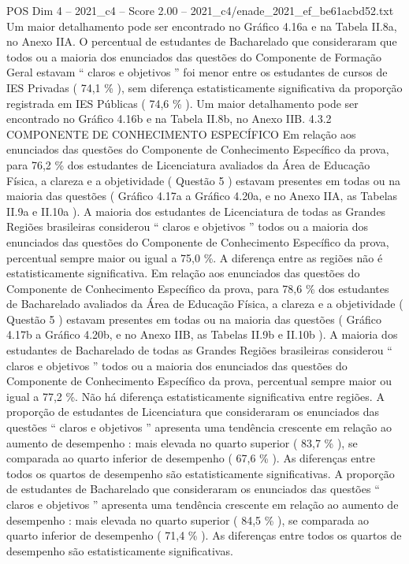 \begin{textsample}{POS Dim 4 – 2021\_c4 – Score 2.00 – 2021\_c4/enade\_2021\_ef\_be61acbd52.txt}
Um maior detalhamento pode ser encontrado no Gráfico 4.16a e na Tabela II.8a, no Anexo IIA.
O percentual de estudantes de Bacharelado que consideraram que todos ou a maioria dos enunciados das questões do Componente de Formação Geral estavam “ claros e objetivos ” foi menor entre os estudantes de cursos de IES Privadas ( 74,1 \% ), sem diferença estatisticamente significativa da proporção registrada em IES Públicas ( 74,6 \% ).
Um maior detalhamento pode ser encontrado no Gráfico 4.16b e na Tabela II.8b, no Anexo IIB. 4.3.2 COMPONENTE DE CONHECIMENTO ESPECÍFICO Em relação aos enunciados das questões do Componente de Conhecimento Específico da prova, para 76,2 \% dos estudantes de Licenciatura avaliados da Área de Educação Física, a clareza e a objetividade ( Questão 5 ) estavam presentes em todas ou na maioria das questões ( Gráfico 4.17a a Gráfico 4.20a, e no Anexo IIA, as Tabelas II.9a e II.10a ).
A maioria dos estudantes de Licenciatura de todas as Grandes Regiões brasileiras considerou “ claros e objetivos ” todos ou a maioria dos enunciados das questões do Componente de Conhecimento Específico da prova, percentual sempre maior ou igual a 75,0 \%.
A diferença entre as regiões não é estatisticamente significativa.
Em relação aos enunciados das questões do Componente de Conhecimento Específico da prova, para 78,6 \% dos estudantes de Bacharelado avaliados da Área de Educação Física, a clareza e a objetividade ( Questão 5 ) estavam presentes em todas ou na maioria das questões ( Gráfico 4.17b a Gráfico 4.20b, e no Anexo IIB, as Tabelas II.9b e II.10b ).
A maioria dos estudantes de Bacharelado de todas as Grandes Regiões brasileiras considerou “ claros e objetivos ” todos ou a maioria dos enunciados das questões do Componente de Conhecimento Específico da prova, percentual sempre maior ou igual a 77,2 \%.
Não há diferença estatisticamente significativa entre regiões.
A proporção de estudantes de Licenciatura que consideraram os enunciados das questões “ claros e objetivos ” apresenta uma tendência crescente em relação ao aumento de desempenho : mais elevada no quarto superior ( 83,7 \% ), se comparada ao quarto inferior de desempenho ( 67,6 \% ).
As diferenças entre todos os quartos de desempenho são estatisticamente significativas.
A proporção de estudantes de Bacharelado que consideraram os enunciados das questões “ claros e objetivos ” apresenta uma tendência crescente em relação ao aumento de desempenho : mais elevada no quarto superior ( 84,5 \% ), se comparada ao quarto inferior de desempenho ( 71,4 \% ).
As diferenças entre todos os quartos de desempenho são estatisticamente significativas.

\end{textsample}
